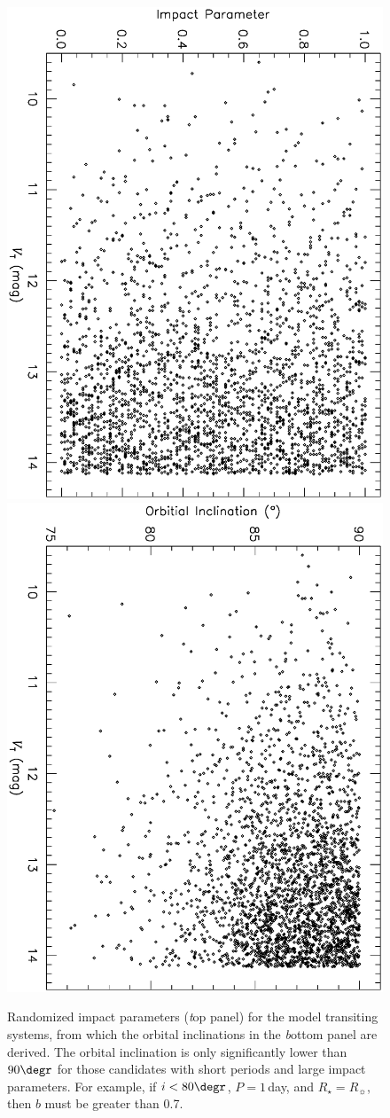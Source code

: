 \begin{figure}
\begin{center}
\centering
\includegraphics[width=.55\textwidth, angle=90]{7_orb_a}\\
\includegraphics[width=.55\textwidth, angle=90]{7_orb_b}\\
\caption[Randomized transit impact parameters and orbital inclinations]{%
Randomized impact parameters ({\textit top panel}) for the model
transiting systems, from which the orbital inclinations in the {\textit bottom panel} are derived.
The orbital inclination is only significantly lower than $90\degr$ for those candidates with short periods and large impact parameters.
For example, if $i<80\degr$, $P=1$\,day, and $R_{\star}=R_{\sun}$, then $b$ must be greater than 0.7. %
}\label{cha:human:sec:model:fig:orb}
\end{center}
\end{figure}

